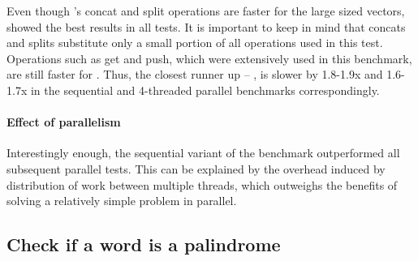 Even though \rrbvec{}'s concat and split operations are faster for the large sized vectors, \stdvec{} showed the best results in all tests. It is important to keep in mind that concats and splits substitute only a small portion of all operations used in this test. Operations such as get and push, which were extensively used in this benchmark, are still faster for \stdvec{}. Thus, the closest runner up -- \pvec{}, is slower by 1.8-1.9x and 1.6-1.7x in the sequential and 4-threaded parallel benchmarks correspondingly. 

\paragraph*{Effect of parallelism}
Interestingly enough, the sequential variant of the benchmark outperformed all subsequent parallel tests. This can be explained by the overhead induced by distribution of work between multiple threads, which outweighs the benefits of solving a relatively simple problem in parallel.

\subsection{Check if a word is a palindrome}

